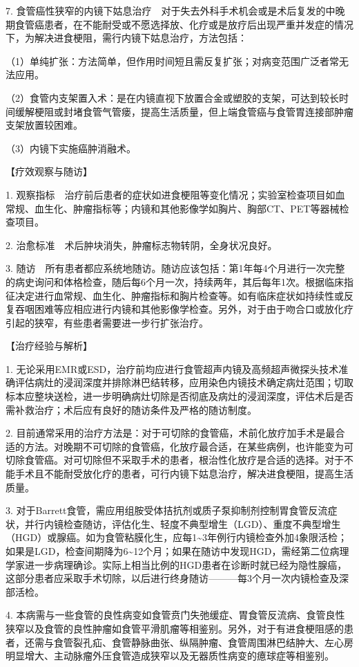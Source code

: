 7.
食管癌性狭窄的内镜下姑息治疗　对于失去外科手术机会或是术后复发的中晚期食管癌患者，在不能耐受或不愿选择放、化疗或是放疗后出现严重并发症的情况下，为解决进食梗阻，需行内镜下姑息治疗，方法包括：

（1）单纯扩张：方法简单，但作用时间短且需反复扩张；对病变范围广泛者常无法应用。

（2）食管内支架置入术：是在内镜直视下放置合金或塑胶的支架，可达到较长时间缓解梗阻或封堵食管气管瘘，提高生活质量，但上端食管癌与食管胃连接部肿瘤支架放置较困难。

（3）内镜下实施癌肿消融术。

【疗效观察与随访】

1.
观察指标　治疗前后患者的症状如进食梗阻等变化情况；实验室检查项目如血常规、血生化、肿瘤指标等；内镜和其他影像学如胸片、胸部CT、PET等器械检查项目。

2. 治愈标准　术后肿块消失，肿瘤标志物转阴，全身状况良好。

3.
随访　所有患者都应系统地随访。随访应该包括：第1年每4个月进行一次完整的病史询问和体格检查，随后每6个月一次，持续两年，其后每年1次。根据临床指征决定进行血常规、血生化、肿瘤指标和胸片检查等。如有临床症状如持续性或反复吞咽困难等应相应进行内镜和其他影像学检查。另外，对于由于吻合口或放化疗引起的狭窄，有些患者需要进一步行扩张治疗。

【治疗经验与解析】

1.
无论采用EMR或ESD，治疗前均应进行食管超声内镜及高频超声微探头技术准确评估病灶的浸润深度并排除淋巴结转移，应用染色内镜技术确定病灶范围；切取标本应整块送检，进一步明确病灶切除是否彻底及病灶的浸润深度，评估术后是否需补救治疗；术后应有良好的随访条件及严格的随访制度。

2.
目前通常采用的治疗方法是：对于可切除的食管癌，术前化放疗加手术是最合适的方法。对晚期不可切除的食管癌，化放疗最合适，在某些病例，也许能变为可切除食管癌。对可切除但不采取手术的患者，根治性化放疗是合适的选择。对于不能手术且不能耐受放化疗的患者，可行内镜下姑息治疗，解决进食梗阻，提高生活质量。

3.
对于Barrett食管，需应用组胺受体拮抗剂或质子泵抑制剂控制胃食管反流症状，并行内镜检查随访，评估化生、轻度不典型增生（LGD）、重度不典型增生（HGD）或腺癌。如为食管粘膜化生，应每1\textasciitilde{}3年例行内镜检查外加4象限活检；如果是LGD，检查间期降为6\textasciitilde{}12个月；如果在随访中发现HGD，需经第二位病理学家进一步病理确诊。实际上相当比例的HGD患者在诊断时就已经为隐性腺癌，这部分患者应采取手术切除，以后进行终身随访---------每3个月一次内镜检查及深部活检。

4.
本病需与一些食管的良性病变如食管贲门失弛缓症、胃食管反流病、食管良性狭窄以及食管的良性肿瘤如食管平滑肌瘤等相鉴别。另外，对于有进食梗阻感的患者，还需与食管裂孔疝、食管静脉曲张、纵隔肿瘤、食管周围淋巴结肿大、左心房明显增大、主动脉瘤外压食管造成狭窄以及无器质性病变的癔球症等相鉴别。

